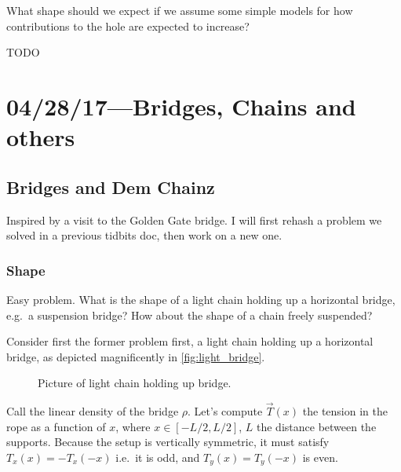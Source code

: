 \documentclass[12pt]{report}
\begin{document}
What shape should we expect if we assume some simple models for how
contributions to the hole are expected to increase?

TODO

\chapter{04/28/17---Bridges,  Chains and others}

\section{Bridges and Dem Chainz}

Inspired by a visit to the Golden Gate bridge. I will first rehash a problem we
solved in a previous tidbits doc, then work on a new one.

\subsection{Shape}

Easy problem. What is the shape of a light chain holding up a horizontal bridge,
e.g.\ a suspension bridge? How about the shape of a chain freely suspended?

Consider first the former problem first, a light chain holding up a horizontal
bridge, as depicted magnificently in \autoref{fig:light_bridge}.
\begin{figure}[!h]
    \centering
    \caption{Picture of light chain holding up bridge.\label{fig:light_bridge}}
\end{figure}

Call the linear density of the bridge $\rho$. Let's compute $\vec{T}(x)$
the tension in the rope as a function of $x$, where $x \in [-L/2,L/2]$, $L$ the
distance between the supports. Because the setup is vertically symmetric, it
must satisfy $T_x(x) = -T_x(-x)$ i.e.\ it is odd, and $T_y(x) = T_y(-x)$ is
even.
\end{document}
